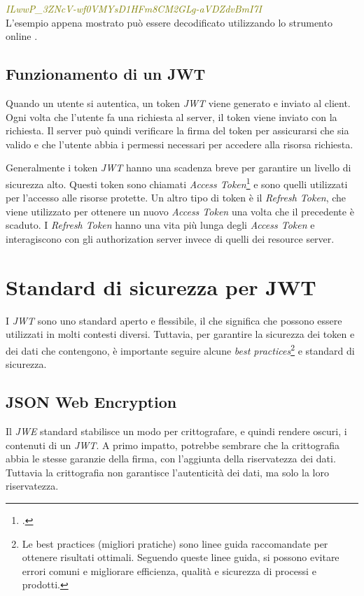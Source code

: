 \noindent \emph{\textcolor{olive}{ILwwP\_3ZNcV-wf0VMYsD1HFm8CM2GLg-aVDZdvBmI7I}}\\

L'esempio appena mostrato può essere decodificato utilizzando lo strumento online \cite{site:jwt-debugger}.


\subsection{Funzionamento di un JWT}
Quando un utente si autentica, un token \emph{JWT} viene generato e inviato al client.
Ogni volta che l'utente fa una richiesta al server, il token viene inviato con la richiesta.
Il server può quindi verificare la firma del token per assicurarsi che sia valido e che l'utente abbia i permessi necessari per accedere alla risorsa richiesta.

Generalmente i token \emph{JWT} hanno una scadenza breve per garantire un livello di sicurezza alto.
Questi token sono chiamati \emph{Access Token}\footcite{site:rfc6749} e sono quelli utilizzati per l'accesso alle risorse protette.
Un altro tipo di token è il \emph{Refresh Token}, che viene utilizzato per ottenere un nuovo \emph{Access Token} una volta che il precedente è scaduto.
I \emph{Refresh Token} hanno una vita più lunga degli \emph{Access Token} e interagiscono con gli authorization server invece di quelli dei resource server.

\section{Standard di sicurezza per JWT}
I \emph{JWT} sono uno standard aperto e flessibile, il che significa che possono essere utilizzati in molti contesti diversi.
Tuttavia, per garantire la sicurezza dei token e dei dati che contengono, è importante seguire alcune \emph{best practices}\footnote{Le best practices (migliori pratiche) sono linee guida raccomandate per ottenere risultati ottimali. Seguendo queste linee guida, si possono evitare errori comuni e migliorare efficienza, qualità e sicurezza di processi e prodotti.} e standard di sicurezza.

\subsection{JSON Web Encryption}
Il \emph{\gls{JWE}} standard stabilisce un modo per crittografare, e quindi rendere oscuri, i contenuti di un \emph{JWT}.
A primo impatto, potrebbe sembrare che la crittografia abbia le stesse garanzie della firma, con l'aggiunta della riservatezza dei dati.
Tuttavia la crittografia non garantisce l'autenticità dei dati, ma solo la loro riservatezza.

